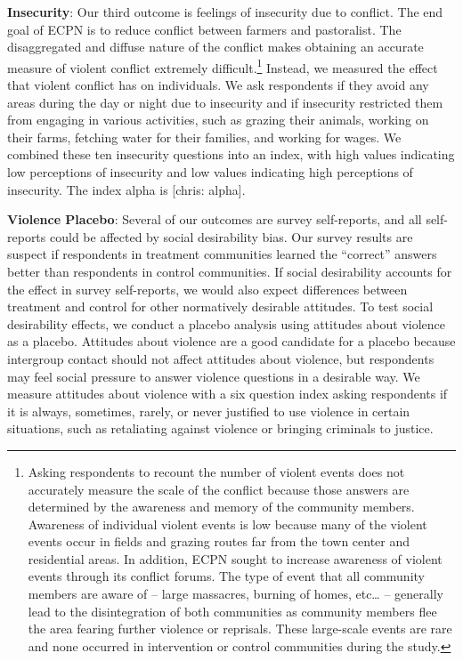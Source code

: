 \documentclass[11pt]{article}
\begin{document}
\textbf{Insecurity}: Our third outcome is feelings of insecurity due to
conflict. The end goal of ECPN is to reduce conflict between farmers and
pastoralist. The disaggregated and diffuse nature of the conflict makes
obtaining an accurate measure of violent conflict extremely
difficult.\footnote{Asking respondents to recount the number of violent
  events does not accurately measure the scale of the conflict because
  those answers are determined by the awareness and memory of the
  community members. Awareness of individual violent events is low
  because many of the violent events occur in fields and grazing routes
  far from the town center and residential areas. In addition, ECPN
  sought to increase awareness of violent events through its conflict
  forums. The type of event that all community members are aware of --
  large massacres, burning of homes, etc\ldots{} -- generally lead to
  the disintegration of both communities as community members flee the
  area fearing further violence or reprisals. These large-scale events
  are rare and none occurred in intervention or control communities
  during the study.} Instead, we measured the effect that violent
conflict has on individuals. We ask respondents if they avoid any areas
during the day or night due to insecurity and if insecurity restricted
them from engaging in various activities, such as grazing their animals,
working on their farms, fetching water for their families, and working
for wages. We combined these ten insecurity questions into an index,
with high values indicating low perceptions of insecurity and low values
indicating high perceptions of insecurity. The index alpha is {[}chris:
alpha{]}.

\textbf{Violence Placebo}: Several of our outcomes are survey
self-reports, and all self-reports could be affected by social
desirability bias. Our survey results are suspect if respondents in
treatment communities learned the ``correct'' answers better than
respondents in control communities. If social desirability accounts for
the effect in survey self-reports, we would also expect differences
between treatment and control for other normatively desirable attitudes.
To test social desirability effects, we conduct a placebo analysis using
attitudes about violence as a placebo. Attitudes about violence are a
good candidate for a placebo because intergroup contact should not
affect attitudes about violence, but respondents may feel social
pressure to answer violence questions in a desirable way. We measure
attitudes about violence with a six question index asking respondents if
it is always, sometimes, rarely, or never justified to use violence in
certain situations, such as retaliating against violence or bringing
criminals to justice.
\end{document}
